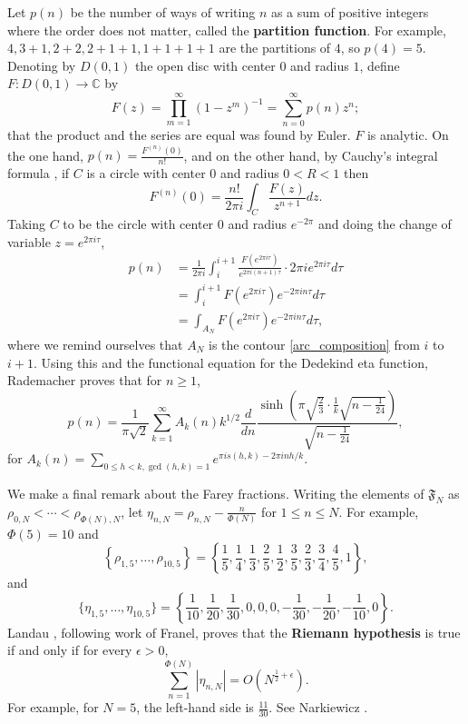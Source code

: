 \documentclass{article}
\begin{document}
Let $p(n)$ be the number of ways of writing $n$ as a sum of positive integers where the order does not matter, called the
\textbf{partition function}. For example, $4,3+1,2+2,2+1+1,1+1+1+1$ are the partitions of $4$, so $p(4)=5$. 
Denoting by $D(0,1)$ the open disc with center $0$ and radius $1$, define $F:D(0,1) \to \mathbb{C}$ by
\[
F(z) = \prod_{m=1}^\infty (1-z^m)^{-1} =  \sum_{n=0}^\infty p(n) z^n;
\]
that the product and the  series are equal was found by Euler.
$F$ is analytic. On the one hand, $p(n) =\frac{F^{(n)}(0)}{n!} $, and on the other hand, by Cauchy's integral formula  \cite[p.~82, Theorem 2.41]{titchmarsh}, if $C$ is a circle with center $0$ and radius $0<R<1$ then 
\[
F^{(n)}(0) = \frac{n!}{2\pi i} \int_C \frac{F(z)}{z^{n+1}} dz.
\]
Taking $C$ to be the circle with center $0$ and
radius $e^{-2\pi}$ and doing the change of variable $z = e^{2\pi i\tau}$, 
\begin{align*}
p(n) & = \frac{1}{2\pi i} \int_i^{i+1} \frac{F(e^{2\pi i\tau})}{e^{2\pi i (n+1)\tau}} \cdot 2\pi i e^{2\pi i\tau}
d\tau\\
&=\int_i^{i+1} F(e^{2\pi i\tau}) e^{-2\pi in\tau} d\tau\\
&=\int_{A_N} F(e^{2\pi i\tau}) e^{-2\pi in\tau} d\tau,
\end{align*}
where we remind ourselves that $A_N$ is the contour \eqref{arc_composition} from $i$ to $i+1$.
Using this and the functional equation for the Dedekind eta function, 
Rademacher \cite[p.~104, Theorem 5.10]{apostol} proves that for $n \geq 1$,
\[
p(n) = \frac{1}{\pi \sqrt{2}} \sum_{k=1}^\infty A_k(n) k^{1/2} \frac{d}{dn}  \frac{ \sinh \left( \pi \sqrt{\frac{2}{3}} \cdot \frac{1}{k} \sqrt{n-\frac{1}{24}}\right)}{\sqrt{n-\frac{1}{24}}},
\]
for $A_k(n) = \sum_{0 \leq h < k, \gcd(h,k)=1} e^{\pi i s(h,k) - 2\pi inh/k}$.


We make a final remark about the Farey fractions. Writing the elements of $\mathfrak{F}_N$ as $\rho_{0,N}<\cdots<\rho_{\Phi(N),N}$,
 let $\eta_{n,N} = \rho_{n,N} - \frac{n}{\Phi(N)}$ for $1 \leq n \leq N$. 
For example,  $\Phi(5)=10$ and
\[
\left\{\rho_{1,5},\ldots,\rho_{10,5}\right\}=
 \left\{\frac{1}{5},\frac{1}{4},\frac{1}{3},\frac{2}{5},\frac{1}{2},\frac{3}{5},\frac{2}{3},\frac{3}{4},\frac{4}{5},1\right\},
\]
and 
\[
\{\eta_{1,5},\ldots,\eta_{10,5}\} = \left\{\frac{1}{10},\frac{1}{20},\frac{1}{30},0,0,0,-\frac{1}{30},
-\frac{1}{20},-\frac{1}{10},0\right\}.
\]
Landau \cite{farey}, following work of Franel, proves that the \textbf{Riemann hypothesis} is true if and only if
for every $\epsilon>0$,
\[
\sum_{n=1}^{\Phi(N)} |\eta_{n,N}| = O(N^{\frac{1}{2}+\epsilon}).
\]
For example, 
for $N=5$, the left-hand side is $\frac{11}{30}$. 
See Narkiewicz \cite[p.~40, \S 2.2.3]{narkiewicz}.
\end{document}
